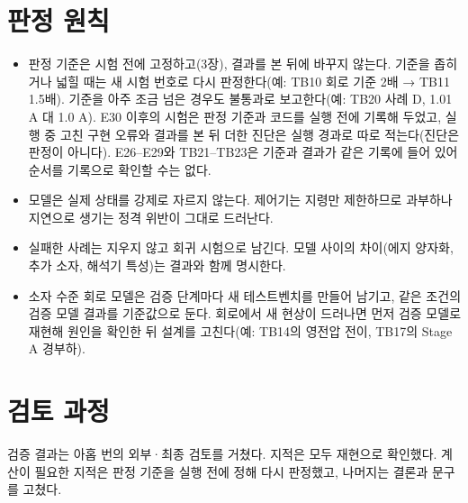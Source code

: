 \section{판정 원칙}

\begin{itemize}
\item 판정 기준은 시험 전에 고정하고(3장), 결과를 본 뒤에 바꾸지 않는다. 기준을 좁히거나 넓힐 때는 새 시험 번호로 다시 판정한다(예: TB10 회로 기준 2배 → TB11 1.5배). 기준을 아주 조금 넘은 경우도 불통과로 보고한다(예: TB20 사례 D, 1.01 A 대 1.0 A). E30 이후의 시험은 판정 기준과 코드를 실행 전에 기록해 두었고, 실행 중 고친 구현 오류와 결과를 본 뒤 더한 진단은 실행 경과로 따로 적는다(진단은 판정이 아니다). E26–E29와 TB21–TB23은 기준과 결과가 같은 기록에 들어 있어 순서를 기록으로 확인할 수는 없다.
\item 모델은 실제 상태를 강제로 자르지 않는다. 제어기는 지령만 제한하므로 과부하나 지연으로 생기는 정격 위반이 그대로 드러난다.
\item 실패한 사례는 지우지 않고 회귀 시험으로 남긴다. 모델 사이의 차이(에지 양자화, 추가 소자, 해석기 특성)는 결과와 함께 명시한다.
\item 소자 수준 회로 모델은 검증 단계마다 새 테스트벤치를 만들어 남기고, 같은 조건의 검증 모델 결과를 기준값으로 둔다. 회로에서 새 현상이 드러나면 먼저 검증 모델로 재현해 원인을 확인한 뒤 설계를 고친다(예: TB14의 영전압 전이, TB17의 Stage A 경부하).
\end{itemize}

\section{검토 과정}

검증 결과는 아홉 번의 외부·최종 검토를 거쳤다. 지적은 모두 재현으로 확인했다. 계산이 필요한 지적은 판정 기준을 실행 전에 정해 다시 판정했고, 나머지는 결론과 문구를 고쳤다.

